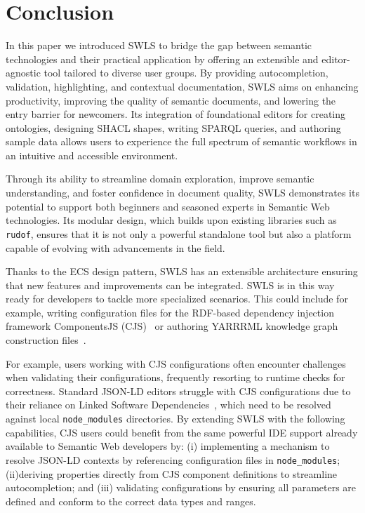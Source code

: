\section{Conclusion}%
\label{sec:conclusion}

In this paper we introduced SWLS to bridge the gap between semantic technologies and their practical application by offering an extensible and editor-agnostic tool tailored to diverse user groups.
By providing autocompletion, validation, highlighting, and contextual documentation, SWLS aims on enhancing productivity, improving the quality of semantic documents, and lowering the entry barrier for newcomers.
Its integration of foundational editors for creating ontologies, designing SHACL shapes, writing SPARQL queries, and authoring sample data allows users to experience the full spectrum of semantic workflows in an intuitive and accessible environment.

Through its ability to streamline domain exploration, improve semantic understanding, and foster confidence in document quality, SWLS demonstrates its potential to support both beginners and seasoned experts in Semantic Web technologies.
Its modular design, which builds upon existing libraries such as \texttt{rudof}, ensures that it is not only a powerful standalone tool but also a platform capable of evolving with advancements in the field.

Thanks to the ECS design pattern, SWLS has an extensible architecture ensuring that new features and improvements can be integrated.
SWLS is in this way ready for developers to tackle more specialized scenarios.
This could include for example, writing configuration files for the RDF-based dependency injection framework ComponentsJS (CJS)~\cite{01GPAWNQ5ZS2DAY0J9JMPQHM9C} or authoring YARRRML knowledge graph construction files~\cite{Heyvaert2018Declarative}.

For example, users working with CJS configurations often encounter challenges when validating their configurations, frequently resorting to runtime checks for correctness.
Standard JSON-LD editors struggle with CJS configurations due to their reliance on Linked Software Dependencies~\cite{CJS2}, which need to be resolved against local \texttt{node\_modules} directories.
By extending SWLS with the following capabilities, CJS users could benefit from the same powerful IDE support already available to Semantic Web developers by: (i) implementing a mechanism to resolve JSON-LD contexts by referencing configuration files in \texttt{node\_modules}; (ii)deriving properties directly from CJS component definitions to streamline autocompletion; and (iii) validating configurations by ensuring all parameters are defined and conform to the correct data types and ranges.

